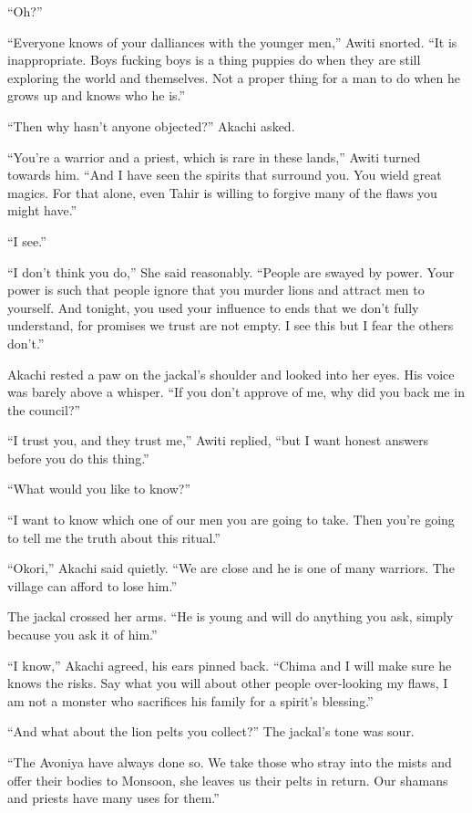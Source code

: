 ``Oh?''

``Everyone knows of your dalliances with the younger men,'' Awiti snorted. ``It is inappropriate. Boys fucking boys is a thing puppies do when they are still exploring the world and themselves. Not a proper thing for a man to do when he grows up and knows who he is.''

``Then why hasn't anyone objected?'' Akachi asked.

``You're a warrior and a priest, which is rare in these lands,'' Awiti turned towards him. ``And I have seen the spirits that surround you. You wield great magics. For that alone, even Tahir is willing to forgive many of the flaws you might have.''

``I see.''

``I don't think you do,'' She said reasonably. ``People are swayed by power. Your power is such that people ignore that you murder lions and attract men to yourself. And tonight, you used your influence to ends that we don't fully understand, for promises we trust are not empty. I see this but I fear the others don't.''

Akachi rested a paw on the jackal's shoulder and looked into her eyes. His voice was barely above a whisper. ``If you don't approve of me, why did you back me in the council?''

``I trust you, and they trust me,'' Awiti replied, ``but I want honest answers before you do this thing.''

``What would you like to know?''

``I want to know which one of our men you are going to take. Then you're going to tell me the truth about this ritual.''

``Okori,'' Akachi said quietly. ``We are close and he is one of many warriors. The village can afford to lose him.''

The jackal crossed her arms. ``He is young and will do anything you ask, simply because you ask it of him.''

``I know,'' Akachi agreed, his ears pinned back. ``Chima and I will make sure he knows the risks. Say what you will about other people over-looking my flaws, I am not a monster who sacrifices his family for a spirit's blessing.''

``And what about the lion pelts you collect?'' The jackal's tone was sour.

``The Avoniya have always done so. We take those who stray into the mists and offer their bodies to Monsoon, she leaves us their pelts in return. Our shamans and priests have many uses for them.''

